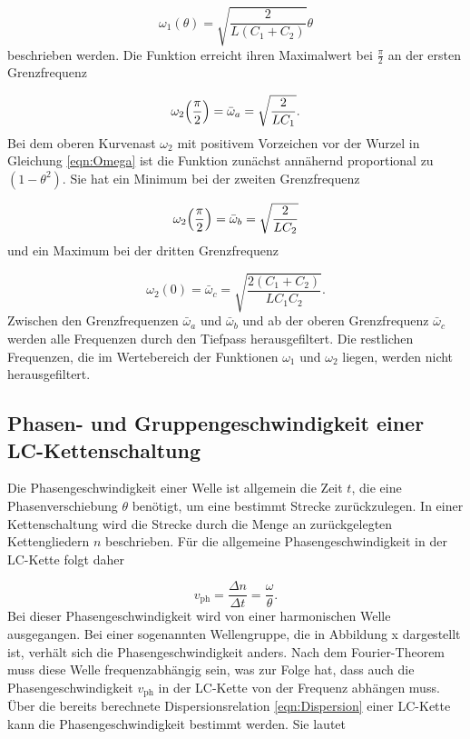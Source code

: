 \begin{equation}
  \omega_1 (\theta) = \sqrt{\frac{2}{L(C_1 + C_2)}} \theta
\end{equation}
beschrieben werden.
Die Funktion erreicht ihren Maximalwert bei $\frac{\pi}{2}$ an
der ersten Grenzfrequenz

\begin{equation}
  \omega_2\Bigl(\frac{\pi}{2}\Bigr) = \bar{\omega}_a = \sqrt{\frac{2}{LC_1}}.
\end{equation}
Bei dem oberen Kurvenast $\omega_2$ mit positivem Vorzeichen vor der Wurzel in
Gleichung \eqref{eqn:Omega} ist die Funktion zunächst annähernd
proportional zu $(1-\theta^2)$.
Sie hat ein Minimum bei der zweiten Grenzfrequenz

\begin{equation}
  \omega_2\Bigl(\frac{\pi}{2}\Bigr) = \bar{\omega}_b = \sqrt{\frac{2}{LC_2}}
\end{equation}
und ein Maximum bei der dritten Grenzfrequenz

\begin{equation}
  \omega_2(0) = \bar{\omega}_c = \sqrt{\frac{2(C_1+C_2)}{LC_1C_2}}.
\end{equation}
Zwischen den Grenzfrequenzen $\bar{\omega}_a$ und $\bar{\omega}_b$ und ab der
oberen Grenzfrequenz $\bar{\omega}_c$ werden alle Frequenzen durch den
Tiefpass herausgefiltert. Die restlichen Frequenzen, die im Wertebereich der
Funktionen $\omega_1$ und $\omega_2$ liegen, werden nicht herausgefiltert.


\subsection{Phasen- und Gruppengeschwindigkeit einer LC-Kettenschaltung}

Die Phasengeschwindigkeit einer Welle ist allgemein die Zeit $t$, die eine
Phasenverschiebung $\theta$ benötigt, um eine bestimmt Strecke zurückzulegen.
In einer Kettenschaltung wird die Strecke durch die Menge an zurückgelegten
Kettengliedern $n$ beschrieben.
Für die allgemeine Phasengeschwindigkeit in der LC-Kette folgt daher

\begin{equation}
  v_\text{ph} = \frac{\Delta n}{\Delta t} = \frac{\omega}{\theta}.
\end{equation}
Bei dieser Phasengeschwindigkeit wird von einer harmonischen Welle ausgegangen.
Bei einer sogenannten Wellengruppe, die in Abbildung x dargestellt ist,
verhält sich die Phasengeschwindigkeit anders. Nach dem Fourier-Theorem
muss diese Welle frequenzabhängig sein, was zur Folge hat, dass auch die
Phasengeschwindigkeit $v_\text{ph}$ in der LC-Kette von der Frequenz abhängen
muss.
Über die bereits berechnete Dispersionsrelation \eqref{eqn:Dispersion} einer
LC-Kette kann die Phasengeschwindigkeit bestimmt werden.
Sie lautet

